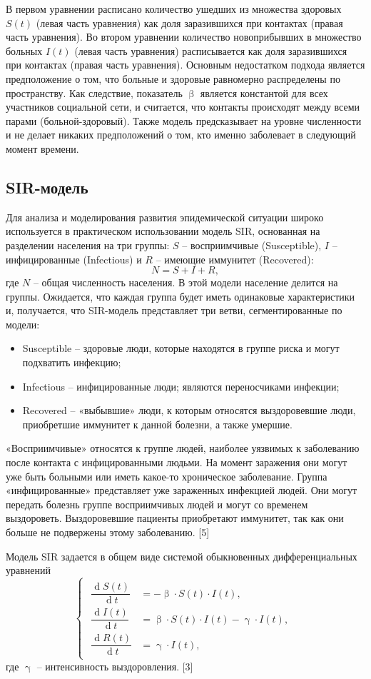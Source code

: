 \documentclass[a4paper, 12pt]{extarticle}
\numberwithin{equation}{section}
\renewcommand{\beta}{\upbeta}
\renewcommand{\gamma}{\upgamma}
\renewcommand{\d}{\operatorname{d}}
\begin{document}
	В первом уравнении расписано количество ушедших из множества здоровых $S(t)$ (левая часть уравнения) как доля заразившихся при контактах (правая часть уравнения). Во втором уравнении количество новоприбывших в множество больных $I(t)$ (левая часть уравнения) расписывается как доля заразившихся при контактах (правая часть уравнения). Основным недостатком подхода является предположение о том, что больные и здоровые равномерно распределены по пространству. Как следствие, показатель $\beta$ является константой для всех участников социальной сети, и считается, что контакты происходят между всеми парами (больной-здоровый). Также модель предсказывает на уровне численности и не делает никаких предположений о том, кто именно заболевает в следующий момент времени.
	
	
	\subsection{SIR-модель}
	Для анализа и моделирования развития эпидемической ситуации широко используется в практическом использовании модель SIR, основанная на разделении населения на три группы: $S$ -- восприимчивые (Susceptible), $I$ -- инфицированные (Infectious) и $R$ -- имеющие иммунитет (Recovered): $$N = S + I + R,$$ где $N$ -- общая численность населения.
	В этой модели население делится на группы. Ожидается, что каждая группа будет иметь одинаковые характеристики и, получается, что SIR-модель представляет три ветви, сегментированные по модели:
	\begin{itemize}
		\item Susceptible – здоровые люди, которые находятся в группе риска и могут подхватить инфекцию;
		\item Infectious – инфицированные люди; являются переносчиками инфекции;
		\item Recovered – «выбывшие» люди, к которым относятся выздоровевшие люди, приобретшие иммунитет к данной болезни, а также умершие.
	\end{itemize}
	«Восприимчивые» относятся к группе людей, наиболее уязвимых к заболеванию после контакта с инфицированными людьми. На момент заражения они могут уже быть больными или иметь какое-то хроническое заболевание. Группа «инфицированные» представляет уже зараженных инфекцией людей. Они могут передать болезнь группе восприимчивых людей и могут со временем выздороветь. Выздоровевшие пациенты приобретают иммунитет, так как они больше не подвержены этому заболеванию. [5]
	
	Модель SIR задается в общем виде системой обыкновенных дифференциальных уравнений 
	\begin{equation}
		\left\{ 
		\begin{gathered} 
			\begin{aligned}
				\dfrac {\d S(t)}{\d t} &= -\beta \cdot S(t) \cdot I(t),\\
				\dfrac{\d I(t)}{\d t} &= \beta \cdot S(t)\cdot I(t) - \gamma\cdot I(t),\\
				\dfrac{\d R(t)}{\d t} &= \gamma\cdot I(t), 
			\end{aligned}
		\end{gathered} 
		\right.
	\end{equation}
	где $\gamma$ -- интенсивность выздоровления. [3]
	
\end{document}
